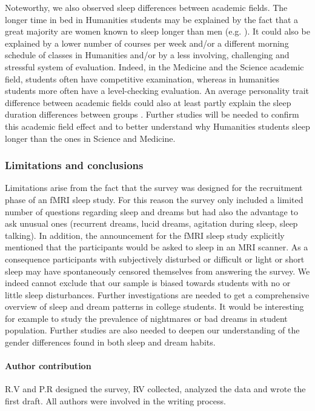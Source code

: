 Noteworthy, we also observed sleep differences between academic fields. The longer time in bed in Humanities students may be explained by the fact that a great majority are women known to sleep longer than men (e.g. \citealp{beck_insomnia_2013}). It could also be explained by a lower number of courses per week and/or a different morning schedule of classes in Humanities and/or by a less involving, challenging and stressful system of evaluation. Indeed, in the Medicine and the Science academic field, students often have competitive examination, whereas in humanities students more often have a level-checking evaluation. An average personality trait difference between academic fields could also at least partly explain the sleep duration differences between groups \citep{hartmann_boundaries_1989}. Further studies will be needed to confirm this academic field effect and to better understand why Humanities students sleep longer than the ones in Science and Medicine.

\subsubsection*{Limitations and conclusions}

Limitations arise from the fact that the survey was designed for the recruitment phase of an fMRI sleep study. For this reason the survey only included a limited number of questions regarding sleep and dreams but had also the advantage to ask unusual ones (recurrent dreams, lucid dreams, agitation during sleep, sleep talking). In addition, the announcement for the fMRI sleep study explicitly mentioned that the participants would be asked to sleep in an MRI scanner. As a consequence participants with subjectively disturbed or difficult or light or short sleep may have spontaneously censored themselves from answering the survey. We indeed cannot exclude that our sample is biased towards students with no or little sleep disturbances. Further investigations are needed to get a comprehensive overview of sleep and dream patterns in college students. It would be interesting for example to study the prevalence of nightmares or bad dreams in student population. Further studies are also needed to deepen our understanding of the gender differences found in both sleep and dream habits.

\paragraph{Author contribution}
R.V and P.R designed the survey, RV collected, analyzed the data and wrote the first draft. All authors were involved in the writing process.

